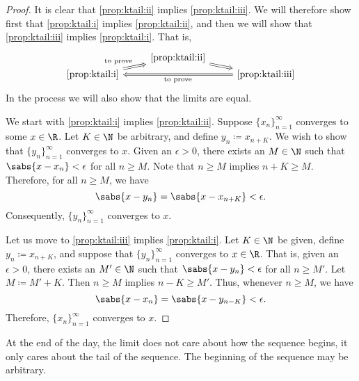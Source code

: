\begin{proof}
It is clear that
\ref{prop:ktail:ii} implies \ref{prop:ktail:iii}.
We will therefore show first that
\ref{prop:ktail:i}
implies
\ref{prop:ktail:ii},
and then we will show that
\ref{prop:ktail:iii}
implies
\ref{prop:ktail:i}.  That is, 
\begin{equation*}
\begin{tikzcd}[row sep=0pt]
& \text{\ref{prop:ktail:ii}} \ar[dr, Rightarrow] & \\
\text{\ref{prop:ktail:i}} \ar[ur, Rightarrow, "\text{to prove}"] & &
\text{\ref{prop:ktail:iii}} \ar[ll, Rightarrow, "\text{to prove}"] 
\end{tikzcd}
\end{equation*}
In the process we will also show that the limits are equal.

We start with \ref{prop:ktail:i} implies \ref{prop:ktail:ii}.
Suppose $\{x_n \}_{n=1}^\infty$ converges to some $x \in \R$.
Let $K \in \N$ be arbitrary, and
define $y_n \coloneqq x_{n+K}$.  We wish to show that $\{ y_n \}_{n=1}^\infty$ converges
to $x$.
Given an $\epsilon > 0$, there exists an $M \in \N$ such that
$\sabs{x-x_n} < \epsilon$ for all $n \geq M$.
Note that $n \geq M$ implies $n+K \geq M$.  Therefore, for
all $n \geq M$, we have
\begin{equation*}
\sabs{x-y_n} = \sabs{x-x_{n+K}} < \epsilon .
\end{equation*}
Consequently, $\{ y_n \}_{n=1}^\infty$ converges to $x$.

Let us move to \ref{prop:ktail:iii} implies \ref{prop:ktail:i}.
Let $K \in \N$ be given, define
$y_n \coloneqq x_{n+K}$, and suppose that $\{ y_n \}_{n=1}^\infty$ converges to $x \in \R$.
That is, given an $\epsilon > 0$, there exists an $M' \in \N$ such that
$\sabs{x-y_n} < \epsilon$ for all $n \geq M'$.
Let $M \coloneqq M'+K$.  Then $n \geq M$ implies $n-K \geq M'$.
Thus, whenever $n \geq M$, we have
\begin{equation*}
\sabs{x-x_n} = \sabs{x-y_{n-K}} < \epsilon.
\end{equation*}
Therefore, $\{ x_n \}_{n=1}^\infty$ converges to $x$.
\end{proof}

At the end of the day, the limit does not care about how the sequence begins, it only
cares about the tail of the sequence.  The beginning of the sequence
may be arbitrary.

